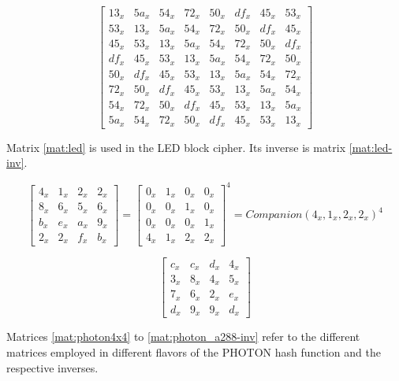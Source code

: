 \begin{equation}\label{mat:grostl-inv}
\begin{bmatrix}
13_x & 5a_x & 54_x & 72_x & 50_x & df_x & 45_x & 53_x\\
53_x & 13_x & 5a_x & 54_x & 72_x & 50_x & df_x & 45_x\\
45_x & 53_x & 13_x & 5a_x & 54_x & 72_x & 50_x & df_x\\
df_x & 45_x & 53_x & 13_x & 5a_x & 54_x & 72_x & 50_x\\
50_x & df_x & 45_x & 53_x & 13_x & 5a_x & 54_x & 72_x\\
72_x & 50_x & df_x & 45_x & 53_x & 13_x & 5a_x & 54_x\\
54_x & 72_x & 50_x & df_x & 45_x & 53_x & 13_x & 5a_x\\
5a_x & 54_x & 72_x & 50_x & df_x & 45_x & 53_x & 13_x
\end{bmatrix}
\end{equation}

Matrix \eqref{mat:led} is used in the LED block cipher. Its inverse is matrix \eqref{mat:led-inv}.

\begin{equation}\label{mat:led}
\begin{bmatrix}
  4_x & 1_x & 2_x & 2_x\\
  8_x & 6_x & 5_x & 6_x\\
  b_x & e_x & a_x & 9_x\\
  2_x & 2_x & f_x & b_x
\end{bmatrix}
=
\begin{bmatrix}
  0_x & 1_x & 0_x & 0_x\\
  0_x & 0_x & 1_x & 0_x\\
  0_x & 0_x & 0_x & 1_x\\
  4_x & 1_x & 2_x & 2_x
\end{bmatrix}^4
=
Companion(4_x,1_x,2_x,2_x)^4
\end{equation}

\begin{equation}\label{mat:led-inv}
  \begin{bmatrix}
  c_x & c_x & d_x & 4_x\\
  3_x & 8_x & 4_x & 5_x\\
  7_x & 6_x & 2_x & e_x\\
  d_x & 9_x & 9_x & d_x
  \end{bmatrix}
\end{equation}

Matrices \eqref{mat:photon4x4} to \eqref{mat:photon_a288-inv} refer to the different matrices employed in different flavors of the PHOTON hash function and the respective inverses.

